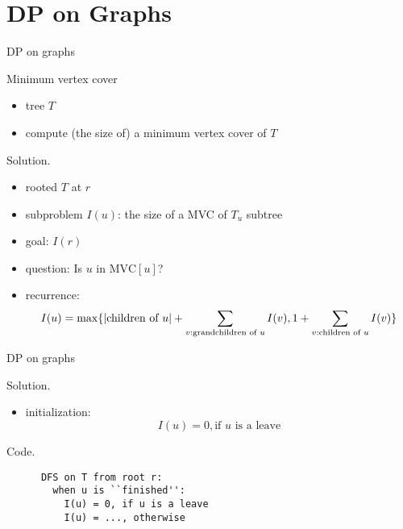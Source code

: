 \section{DP on Graphs}

\begin{frame}{DP on graphs}
  \begin{exampleblock}{Minimum vertex cover }
    \begin{itemize}
      \item tree $T$
      \item compute (the size of) a minimum vertex cover of $T$
    \end{itemize}
  \end{exampleblock}

  \begin{block}{Solution.}
    \begin{itemize}
      \item rooted $T$ at $r$
      \item subproblem $I(u)$: the size of a MVC of $T_{u}$ subtree
      \item goal: $I(r)$
      \item question: Is $u$ in $\text{MVC}[u]$?
      \item recurrence:
	\[
	  I(u) = \max \{|\text{children of } u| + \sum_{v: \text{grandchildren of } u} I(v), 1 + \sum_{v: \text{children of } u} I(v)\}
	\]
    \end{itemize}
  \end{block}
\end{frame}
\begin{frame}[fragile]{DP on graphs}
  \begin{block}{Solution.}
    \begin{itemize}
      \item initialization: 
	\[
	  I(u) = 0, \text{if } u \text{ is a leave}
	\]
    \end{itemize}
  \end{block}

  \begin{block}{Code.}
    \begin{verbatim}
      DFS on T from root r:
        when u is ``finished'': 
          I(u) = 0, if u is a leave
          I(u) = ..., otherwise
    \end{verbatim}
  \end{block}
\end{frame}
